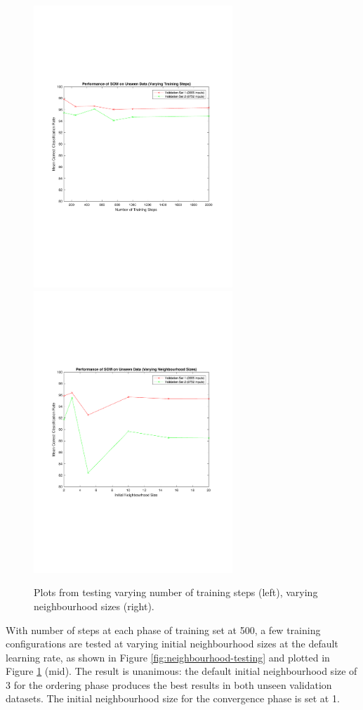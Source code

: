 \documentclass[10pt, oneside]{article}
\begin{document}
\begin{figure}[h]
\begin{center}
\includegraphics[width=7.5cm]{steps-plot.pdf} \includegraphics[width=7.5cm]{neighbourhood-plot.pdf}
\end{center}
\caption{\label{fig:testing-plots} Plots from testing varying number of training steps (left), varying neighbourhood sizes (right).}
\end{figure}

With number of steps at each phase of training set at 500, a few training configurations are tested at varying initial neighbourhood sizes at the default learning rate, as shown in Figure \ref{fig:neighbourhood-testing} and plotted in Figure \ref{fig:testing-plots} (mid). The result is unanimous: the default initial neighbourhood size of 3 for the ordering phase produces the best results in both unseen validation datasets. The initial neighbourhood size for the convergence phase is set at 1.
\end{document}
